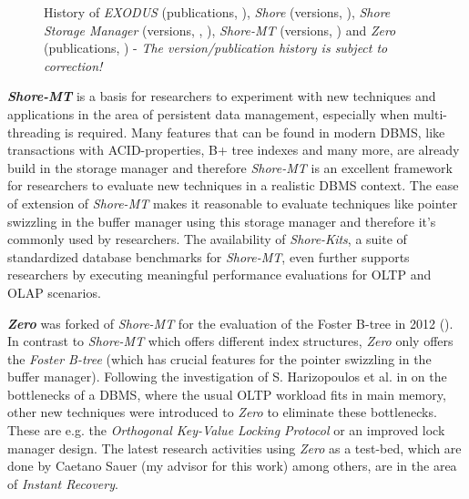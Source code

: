 \begin{figure}[ht!]
{
		}
        \vspace{.5em}
		\caption{History of \emph{EXODUS} (publications, \cite{EXODUSPapers}), \emph{Shore} (versions, \cite{ShoreReleases}), \emph{Shore Storage Manager} (versions, \cite{ShoreReleases}, \cite{ShoreSMReleases}), \emph{Shore-MT} (versions, \cite{ShoreMTReleases}) and \emph{Zero} (publications, \cite{ZeroPapers}) - \textit{The version/publication history is subject to correction!}}
		\label{fig:testbedhistory}
	\end{figure}

	\textbf{\emph{Shore-MT}} is a basis for researchers to experiment with new techniques and applications in the area of persistent data management, especially when multi-threading is required. Many features that can be found in modern DBMS, like transactions with ACID-properties, B+ tree indexes and many more, are already build in the storage manager and therefore \emph{Shore-MT} is an excellent framework for researchers to evaluate new techniques in a realistic DBMS context. The ease of extension of \emph{Shore-MT} makes it reasonable to evaluate techniques like pointer swizzling in the buffer manager using this storage manager and therefore it's commonly used by researchers. The availability of \emph{Shore-Kits}, a suite of standardized database benchmarks for \emph{Shore-MT}, even further supports researchers by executing meaningful performance evaluations for OLTP and OLAP scenarios.

	\textbf{\emph{Zero}} was forked of \emph{Shore-MT} for the evaluation of the Foster B-tree in 2012 (\cite{Graefe:2012}). In contrast to \emph{Shore-MT} which offers different index structures, \emph{Zero} only offers the \emph{Foster B-tree} (which has crucial features for the pointer swizzling in the buffer manager). Following the investigation of S. Harizopoulos et al. in \cite{Harizopoulos:2008} on the bottlenecks of a DBMS, where the usual OLTP workload fits in main memory, other new techniques were introduced to \emph{Zero} to eliminate these bottlenecks. These are e.g. the \emph{Orthogonal Key-Value Locking Protocol} or an improved lock manager design. The latest research activities using \emph{Zero} as a test-bed, which are done by Caetano Sauer (my advisor for this work) among others, are in the area of \emph{Instant Recovery}.


